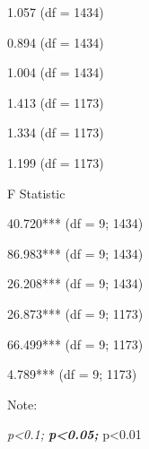\documentclass[
]{article}
\begin{document}
\begin{landscape}
1.057 (df = 1434)

0.894 (df = 1434)

1.004 (df = 1434)

1.413 (df = 1173)

1.334 (df = 1173)

1.199 (df = 1173)

F Statistic

40.720*** (df = 9; 1434)

86.983*** (df = 9; 1434)

26.208*** (df = 9; 1434)

26.873*** (df = 9; 1173)

66.499*** (df = 9; 1173)

4.789*** (df = 9; 1173)

Note:

\emph{p\textless0.1; \textbf{p\textless0.05; }}p\textless0.01

\end{landscape}
\end{document}
